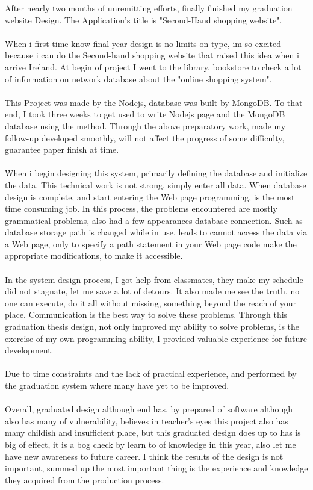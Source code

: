 After nearly two months of unremitting efforts, finally finished my graduation website Design. The Application's title is "Second-Hand shopping website".\\
\\
When i first time know final year design is no limits on type, im so excited because i can do the Second-hand shopping website that raised this idea when i arrive Ireland. At begin of project I went to the library, bookstore to check a lot of information on network database about the "online shopping system".\\
\\
This Project was made by the Nodejs, database was built by MongoDB. To that end, I took three weeks to get used to write Nodejs page and the MongoDB database using the method. Through the above preparatory work, made my follow-up developed smoothly, will not affect the progress of some difficulty, guarantee paper finish at time.\\
\\
When i begin designing this system, primarily defining the database and initialize the data. This technical work is not strong, simply enter all data. When database design is complete, and start entering the Web page programming, is the most time consuming job. In this process, the problems encountered are mostly grammatical problems, also had a few appearances database connection. Such as database storage path is changed while in use, leads to cannot access the data via a Web page, only to specify a path statement in your Web page code make the appropriate modifications, to make it accessible.\\
\\
In the system design process, I got help from classmates, they make my schedule did not stagnate, let me save a lot of detours. It also made me see the truth, no one can execute, do it all without missing, something beyond the reach of your place. Communication is the best way to solve these problems. Through this graduation thesis design, not only improved my ability to solve problems, is the exercise of my own programming ability, I provided valuable experience for future development.\\
\\
Due to time constraints and the lack of practical experience, and performed by the graduation system where many have yet to be improved.\\
\\
Overall, graduated design although end has, by prepared of software although also has many of vulnerability, believes in teacher's eyes this project also has many childish and insufficient  place, but this graduated design does up to has is big of effect, it is a bog check by learn to of knowledge in this year, also let me have new awareness to future career. I think the results of the design is not important, summed up the most important thing is the experience and knowledge they acquired from the production process.